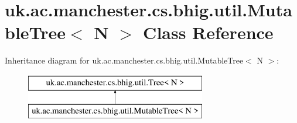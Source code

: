 \hypertarget{classuk_1_1ac_1_1manchester_1_1cs_1_1bhig_1_1util_1_1_mutable_tree_3_01_n_01_4}{\section{uk.\-ac.\-manchester.\-cs.\-bhig.\-util.\-Mutable\-Tree$<$ N $>$ Class Reference}
\label{classuk_1_1ac_1_1manchester_1_1cs_1_1bhig_1_1util_1_1_mutable_tree_3_01_n_01_4}
}
Inheritance diagram for uk.\-ac.\-manchester.\-cs.\-bhig.\-util.\-Mutable\-Tree$<$ N $>$\-:\begin{figure}[H]
\begin{center}
\leavevmode
\includegraphics[height=2.000000cm]{classuk_1_1ac_1_1manchester_1_1cs_1_1bhig_1_1util_1_1_mutable_tree_3_01_n_01_4}
\end{center}
\end{figure}
